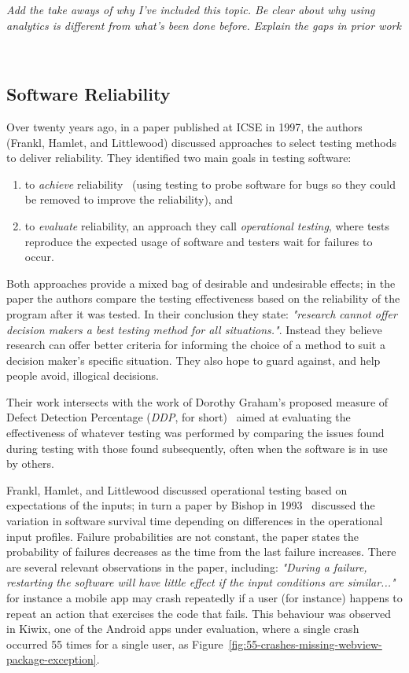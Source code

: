 \emph{Add the take aways of why I've included this topic. Be clear about why using analytics is different from what's been done before. Explain the gaps in prior work}

~\hypertarget{software.reliability}{}
\subsection{Software Reliability}
Over twenty years ago, in a paper published at ICSE in 1997, the authors (Frankl, Hamlet, and Littlewood) discussed approaches to select testing methods to deliver reliability. They identified two main goals in testing software: 
\begin{enumerate}
    \item to \emph{achieve} reliability~\cite{frankl1997choosing_testing_for_reliability} (using testing to probe software for bugs so they could be removed to improve the reliability), and 
    \item to \emph{evaluate} reliability, an approach they call \emph{operational testing}, where tests reproduce the expected usage of software and testers wait for failures to occur.
\end{enumerate}

Both approaches provide a mixed bag of desirable and undesirable effects; in the paper the authors compare the testing effectiveness based on the reliability of the program after it was tested. In their conclusion they state: \emph{"research cannot offer decision makers a best testing method for all situations."}. Instead they believe research can offer better criteria for informing the choice of a method to suit a decision maker's specific situation. They also hope to guard against, and help people avoid, illogical decisions.

Their work intersects with the work of Dorothy Graham's proposed measure of Defect Detection Percentage (\emph{DDP}, for short)~\cite{graham_measuring_2009} aimed at evaluating the effectiveness of whatever testing was performed by comparing the issues found during testing with those found subsequently, often when the software is in use by others.

Frankl, Hamlet, and Littlewood discussed operational testing based on expectations of the inputs; in turn a paper by Bishop in 1993~\cite{bishop1993variation} discussed the variation in software survival time depending on differences in the operational input profiles. Failure probabilities are not constant, the paper states the probability of failures decreases as the time from the last failure increases. There are several relevant observations in the paper, including: \emph{"During a failure, restarting the software will have little effect if the input conditions are similar..."} for instance a mobile app may crash repeatedly if a user (for instance) happens to repeat an action that exercises the code that fails. This behaviour was observed in Kiwix, one of the Android apps under evaluation, where a single crash occurred 55 times for a single user, as Figure~\ref{fig:55-crashes-missing-webview-package-exception}.

